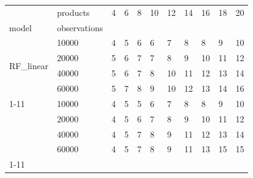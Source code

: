 \begin{tabular}{lllllllllll}
\toprule
 & products & 4 & 6 & 8 & 10 & 12 & 14 & 16 & 18 & 20 \\
model & observations &  &  &  &  &  &  &  &  &  \\
\midrule
\multirow[t]{4}{*}{RF_linear} & 10000 & 4 & 5 & 6 & 6 & 7 & 8 & 8 & 9 & 10 \\
 & 20000 & 5 & 6 & 7 & 7 & 8 & 9 & 10 & 11 & 12 \\
 & 40000 & 5 & 6 & 7 & 8 & 10 & 11 & 12 & 13 & 14 \\
 & 60000 & 5 & 7 & 8 & 9 & 10 & 12 & 13 & 14 & 16 \\
\cline{1-11}
\multirow[t]{4}{*}{RF_quadratic} & 10000 & 4 & 5 & 5 & 6 & 7 & 8 & 8 & 9 & 10 \\
 & 20000 & 4 & 5 & 6 & 7 & 8 & 9 & 10 & 11 & 12 \\
 & 40000 & 4 & 5 & 7 & 8 & 9 & 11 & 12 & 13 & 14 \\
 & 60000 & 4 & 5 & 7 & 8 & 9 & 11 & 13 & 15 & 15 \\
\cline{1-11}
\bottomrule
\end{tabular}
